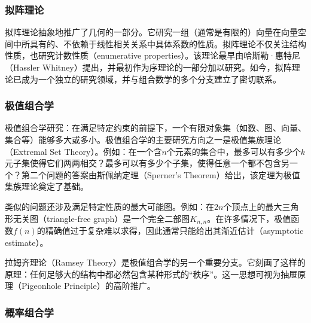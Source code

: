 \subsubsection{拟阵理论}
拟阵理论抽象地推广了几何的一部分。它研究一组（通常是有限的）向量在向量空间中所具有的、不依赖于线性相关关系中具体系数的性质。拟阵理论不仅关注结构性质，也研究计数性质（enumerative properties）。该理论最早由哈斯勒·惠特尼（Hassler Whitney）提出，并最初作为序理论的一部分加以研究。如今，拟阵理论已成为一个独立的研究领域，并与组合数学的多个分支建立了密切联系。
\subsubsection{极值组合学}
极值组合学研究：在满足特定约束的前提下，一个有限对象集（如数、图、向量、集合等）能够多大或多小。极值组合学的主要研究方向之一是极值集族理论（Extremal Set Theory）。例如：在一个含$n$个元素的集合中，最多可以有多少个$k$元子集使得它们两两相交？最多可以有多少个子集，使得任意一个都不包含另一个？第二个问题的答案由斯佩纳定理（Sperner’s Theorem）给出，该定理为极值集族理论奠定了基础。

类似的问题还涉及满足特定性质的最大可能图。例如：在$2n$个顶点上的最大三角形无关图（triangle-free graph）是一个完全二部图$K_{n,n}$。在许多情况下，极值函数$f(n)$的精确值过于复杂难以求得，因此通常只能给出其渐近估计（asymptotic estimate）。

拉姆齐理论（Ramsey Theory）是极值组合学的另一个重要分支。它刻画了这样的原理：任何足够大的结构中都必然包含某种形式的“秩序”。这一思想可视为抽屉原理（Pigeonhole Principle）的高阶推广。
\subsubsection{概率组合学}



